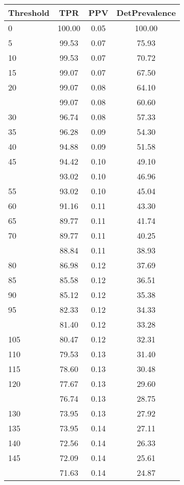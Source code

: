 \begin{table}[ht]
\centering
\begin{tabular}{lccc}
  \toprule
Threshold & TPR & PPV & DetPrevalence \\ 
  \midrule
0 & 100.00 & 0.05 & 100.00 \\ 
  5 & 99.53 & 0.07 & 75.93 \\ 
  10 & 99.53 & 0.07 & 70.72 \\ 
  15 & 99.07 & 0.07 & 67.50 \\ 
  20 & 99.07 & 0.08 & 64.10 \\ 
   \addlinespace
25 & 99.07 & 0.08 & 60.60 \\ 
  30 & 96.74 & 0.08 & 57.33 \\ 
  35 & 96.28 & 0.09 & 54.30 \\ 
  40 & 94.88 & 0.09 & 51.58 \\ 
  45 & 94.42 & 0.10 & 49.10 \\ 
   \addlinespace
50 & 93.02 & 0.10 & 46.96 \\ 
  55 & 93.02 & 0.10 & 45.04 \\ 
  60 & 91.16 & 0.11 & 43.30 \\ 
  65 & 89.77 & 0.11 & 41.74 \\ 
  70 & 89.77 & 0.11 & 40.25 \\ 
   \addlinespace
75 & 88.84 & 0.11 & 38.93 \\ 
  80 & 86.98 & 0.12 & 37.69 \\ 
  85 & 85.58 & 0.12 & 36.51 \\ 
  90 & 85.12 & 0.12 & 35.38 \\ 
  95 & 82.33 & 0.12 & 34.33 \\ 
   \addlinespace
100 & 81.40 & 0.12 & 33.28 \\ 
  105 & 80.47 & 0.12 & 32.31 \\ 
  110 & 79.53 & 0.13 & 31.40 \\ 
  115 & 78.60 & 0.13 & 30.48 \\ 
  120 & 77.67 & 0.13 & 29.60 \\ 
   \addlinespace
125 & 76.74 & 0.13 & 28.75 \\ 
  130 & 73.95 & 0.13 & 27.92 \\ 
  135 & 73.95 & 0.14 & 27.11 \\ 
  140 & 72.56 & 0.14 & 26.33 \\ 
  145 & 72.09 & 0.14 & 25.61 \\ 
   \addlinespace
150 & 71.63 & 0.14 & 24.87 \\ 

\end{tabular}
\end{table}
